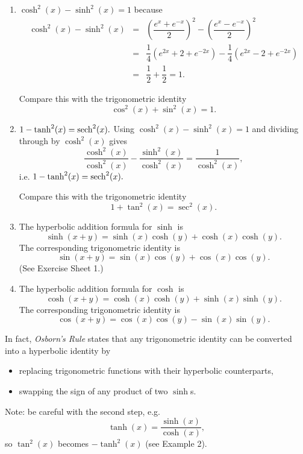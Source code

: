 \begin{examples}
  \quad
  \begin{enumerate}
		\item \(\cosh^{2}(x) - \sinh^{2}(x) = 1\) because
\begin{eqnarray*}
 \cosh^{2}(x) - \sinh^{2}(x)
 &=& \left(\dfrac{e^{x}+e^{-x}}{2}\right)^2
 - \left(\dfrac{e^{x}-e^{-x}}{2}\right)^2 \\
 &=& \dfrac{1}{4} \left(e^{2x} + 2 + e^{-2x}\right)
 - \dfrac{1}{4} \left(e^{2x} - 2 + e^{-2x}\right) \\
 &=& \dfrac{1}{2} + \dfrac{1}{2} = 1.
\end{eqnarray*}

Compare this with the trigonometric identity
\[
 \cos^{2}(x) + \sin^{2}(x) = 1.
\]
    \item \(1 - \tanh^2(x) = \operatorname{sech}^2(x).\)  Using \(\cosh^2(x) - \sinh^2(x) = 1\) and dividing through by \(\cosh^2(x)\) gives
		\[
		  \frac{\cosh^2(x)}{\cosh^2(x)} - \frac{\sinh^2(x)}{\cosh^2(x)} = \frac{1}{\cosh^2(x)},
		\]
		i.e. \(1 - \tanh^2(x) = \operatorname{sech}^2(x).\)
		
		Compare this with the trigonometric identity 
		  \[
			  1 + \tan^2(x) = \sec^2(x).
			\]
		\item The hyperbolic addition formula for \(\sinh\) is
		  \[
			  \sinh(x + y) = \sinh(x)\cosh(y) + \cosh(x)\cosh(y).
			\]
		The corresponding trigonometric identity is
		  \[
			  \sin(x + y) = \sin(x)\cos(y) + \cos(x)\cos(y).
			\]
		(See Exercise Sheet 1.)
		\item The hyperbolic addition formula for \(\cosh\) is
		  \[
			  \cosh(x + y) = \cosh(x)\cosh(y) + \sinh(x)\sinh(y).
			\]
		The corresponding trigonometric identity is
		  \[
			  \cos(x + y) = \cos(x)\cos(y) - \sin(x)\sin(y).
			\]
	\end{enumerate}
\end{examples}	


	In fact, \emph{Osborn's Rule} states that any trigonometric identity can be converted into a hyperbolic identity by
	  \begin{itemize}
			\item replacing trigonometric functions with their hyperbolic counterparts,
			\item swapping the sign of any product of two \(\sinh\)s.
		\end{itemize}
	Note: be careful with the second step, e.g.
	  \[
		  \tanh(x) = \frac{\sinh(x)}{\cosh(x)},
		\]
	so \(\tan^2(x)\) becomes \(-\tanh^2(x)\) (see Example 2).
	
